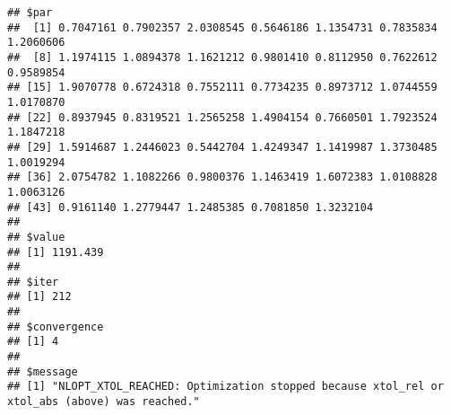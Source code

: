\documentclass[
]{article}
\newenvironment{Shaded}{\begin{snugshade}}{\end{snugshade}}
\newcommand{\AttributeTok}[1]{\textcolor[rgb]{0.77,0.63,0.00}{#1}}
\newcommand{\ControlFlowTok}[1]{\textcolor[rgb]{0.13,0.29,0.53}{\textbf{#1}}}
\newcommand{\DecValTok}[1]{\textcolor[rgb]{0.00,0.00,0.81}{#1}}
\newcommand{\FloatTok}[1]{\textcolor[rgb]{0.00,0.00,0.81}{#1}}
\newcommand{\FunctionTok}[1]{\textcolor[rgb]{0.00,0.00,0.00}{#1}}
\newcommand{\NormalTok}[1]{#1}
\newcommand{\OtherTok}[1]{\textcolor[rgb]{0.56,0.35,0.01}{#1}}
\newcommand{\SpecialCharTok}[1]{\textcolor[rgb]{0.00,0.00,0.00}{#1}}
\begin{document}
\begin{Shaded}
\end{Shaded}

\begin{verbatim}
## $par
##  [1] 0.7047161 0.7902357 2.0308545 0.5646186 1.1354731 0.7835834 1.2060606
##  [8] 1.1974115 1.0894378 1.1621212 0.9801410 0.8112950 0.7622612 0.9589854
## [15] 1.9070778 0.6724318 0.7552111 0.7734235 0.8973712 1.0744559 1.0170870
## [22] 0.8937945 0.8319521 1.2565258 1.4904154 0.7660501 1.7923524 1.1847218
## [29] 1.5914687 1.2446023 0.5442704 1.4249347 1.1419987 1.3730485 1.0019294
## [36] 2.0754782 1.1082266 0.9800376 1.1463419 1.6072383 1.0108828 1.0063126
## [43] 0.9161140 1.2779447 1.2485385 0.7081850 1.3232104
## 
## $value
## [1] 1191.439
## 
## $iter
## [1] 212
## 
## $convergence
## [1] 4
## 
## $message
## [1] "NLOPT_XTOL_REACHED: Optimization stopped because xtol_rel or xtol_abs (above) was reached."
\end{verbatim}
\end{document}
